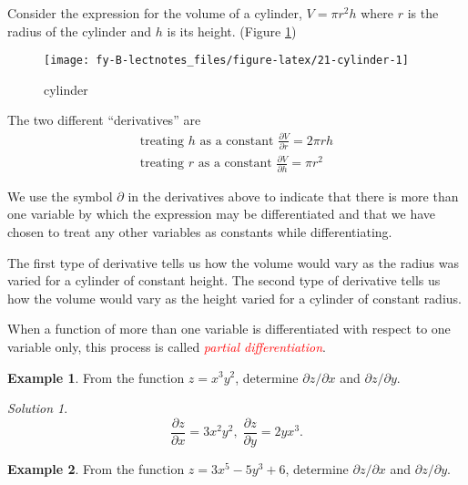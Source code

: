 \documentclass[
  11pt,
  oneside]{book}
\newcommand{\slide}{}
\theoremstyle{definition}
\theoremstyle{definition}
\newtheorem{example}{Example}[chapter]
\theoremstyle{definition}
\theoremstyle{definition}
\theoremstyle{remark}
\newtheorem*{solution}{Solution}
\begin{document}
Consider the expression for the volume of a cylinder, \(V = \pi r^2h\) where \(r\) is the radius of the cylinder and \(h\) is its height. (Figure \ref{fig:21-cylinder})

\begin{figure}

{\centering \texttt{[image: fy-B-lectnotes\_files/figure-latex/21-cylinder-1]} 

}

\caption{cylinder}\label{fig:21-cylinder}
\end{figure}

The two different ``derivatives'' are
\begin{gather*}
\text{treating }h\text{ as a constant } \frac{\partial V}{\partial r} = 2\pi rh\\
\text{treating }r\text{ as a constant } \frac{\partial V}{\partial h} = \pi r^2
\end{gather*}
\slide

We use the symbol \(\partial\) in the derivatives above to indicate that there is more than one variable by which the expression may be differentiated and that we have chosen to treat any other variables as constants while differentiating.

The first type of derivative tells us how the volume would vary as the radius was varied for a cylinder of constant height. The second type of derivative tells us how the volume would vary as the height varied for a cylinder of constant radius.

When a function of more than one variable is differentiated with respect to one variable only, this process is called \textcolor{red}{\em partial differentiation}.

\slide

\begin{example}
From the function \(z=x^3y^2\), determine \(\partial z/\partial x\) and \(\partial z/\partial y\).
\end{example}

\begin{solution}
\[
\frac{\partial z}{\partial x} = 3x^2y^2,\;\frac{\partial z}{\partial y} = 2yx^3.
\]
\end{solution}

\slide

\begin{example}
From the function \(z=3x^5-5y^3+6\), determine \(\partial z/\partial x\) and \(\partial z/\partial y\).
\end{example}
\end{document}
